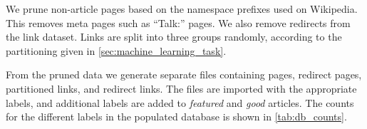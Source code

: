 \begin{center}
\end{center}

We prune non-article pages based on the namespace prefixes used on Wikipedia. This removes meta pages such as \enquote{Talk:} pages. We also remove redirects from the link dataset. Links are split into three groups randomly, according to the partitioning given in \cref{sec:machine_learning_task}. 

From the pruned data we generate separate files containing pages, redirect pages, partitioned links, and redirect links.  The files are imported with the appropriate labels, and additional labels are added to \emph{featured} and \emph{good} articles.
 The counts for the different labels in the populated database is shown in \cref{tab:db_counts}. 

